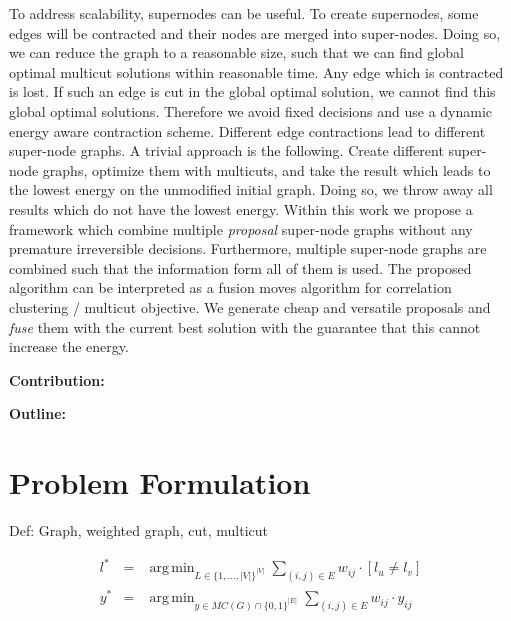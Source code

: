 \documentclass[10pt,twocolumn,letterpaper]{article}
\DeclareMathOperator*{\argmin}{arg\,min}
\begin{document}
To address scalability, supernodes can be useful.
To create supernodes, some edges will be contracted
and their nodes are merged into super-nodes.
Doing so, we can reduce  the graph 
to a reasonable size, such that we can find
global optimal multicut solutions within reasonable time.
%
Any edge which is contracted is lost.
If such an edge is cut in the global optimal solution, we cannot 
find this global optimal solutions.
Therefore we avoid fixed decisions and use a
dynamic energy aware contraction scheme.
%
Different edge contractions lead to different super-node graphs.
A trivial approach is the following.
Create different super-node graphs, optimize them with multicuts,
and take the result which leads to the lowest energy
on the unmodified initial graph.
% 
Doing so, we throw away all results which do not have the lowest energy.
Within this work we propose a framework which 
combine multiple \emph{proposal} super-node graphs
without any premature irreversible decisions.
Furthermore, multiple super-node graphs are combined such
that the information form all of them is used.
%
The proposed algorithm can be interpreted as a fusion moves
algorithm for correlation clustering / multicut objective.
We generate cheap and versatile proposals
and \emph{fuse} them with the current best solution with the
guarantee that this cannot increase the energy.


\textbf{Contribution:}

\textbf{Outline:}


\section{Problem Formulation}
Def: Graph, weighted graph, cut, multicut 


\begin{center}
    \begin{eqnarray}
        l^* &=& \argmin_{L \in \{1,\ldots,|V|\}^{|V|}} \sum_{ (i,j) \in E } w_{ij} \cdot [l_{u} \neq l_{v}] \label{eq:nodeproblem}\\
        y^* &=& \argmin_{y \in MC(G)\cap \{0,1\}^{|E|}} \sum_{ (i,j) \in E } w_{ij} \cdot y_{ij} \label{eq:edgeproblem}%
    \end{eqnarray}
\end{center}
\end{document}
